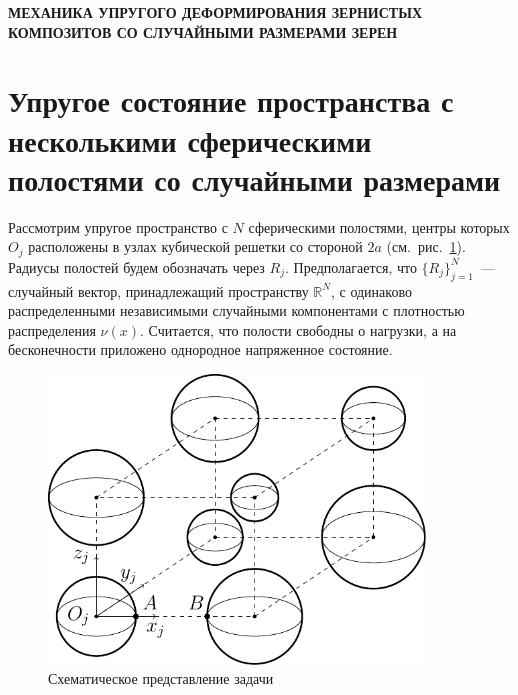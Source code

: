 
\begin{center}
{\normalsize\textbf{\centering\thechapter\; МЕХАНИКА УПРУГОГО ДЕФОРМИРОВАНИЯ ЗЕРНИСТЫХ КОМПОЗИТОВ СО СЛУЧАЙНЫМИ РАЗМЕРАМИ ЗЕРЕН}}\vspace{14pt} 
\end{center}



\section{Упругое состояние пространства с несколькими сферическими полостями со случайными размерами}

Рассмотрим упругое пространство с $N$ сферическими полостями, центры которых $O_j$ расположены в узлах кубической решетки со стороной $2a$ (см.~рис.~\ref{f:8:5}). Радиусы полостей будем обозначать через $R_j$. Предполагается, что $\{R_j\}_{j=1}^N$~--- случайный вектор, принадлежащий пространству $\mathbb{R}^N$, с одинаково распределенными независимыми случайными компонентами с плотностью распределения $\nu(x)$. Считается, что полости свободны о нагрузки, а на бесконечности приложено однородное напряженное состояние.

\begin{figure}[h!]
\centering
\includegraphics[width=10cm]{cartesian-spheres-stoch.pdf}
\caption{	Схематическое представление задачи}
\label{f:8:5}
\end{figure}

